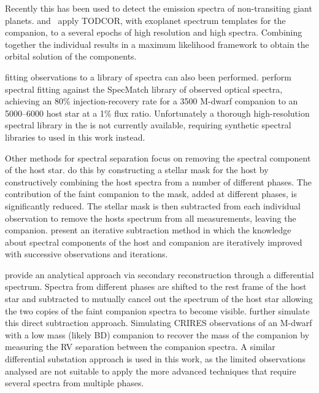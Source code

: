 Recently this has been used to detect the emission spectra of non-transiting giant planets. \citet{lockwood_nearir_2014} and~\citet{piskorz_evidence_2016} apply TODCOR, with exoplanet spectrum templates for the companion, to a several epochs of high resolution and high \snr{} \nir{} spectra. Combining together the individual results in a maximum likelihood framework to obtain the orbital solution of the components.

\textchisquared{} fitting observations to a library of spectra can also been performed.
\citet{kolbl_detection_2015} perform spectral fitting against the {SpecMatch} library of observed optical spectra, achieving an 80\% injection-recovery rate for a 3500\K{} {M-dwarf} companion to an 5000--6000\K{} host star at a 1\% flux ratio. Unfortunately a thorough high-resolution spectral library in the \nir{} is not currently available, requiring synthetic spectral libraries to used in this work instead.

Other methods for spectral separation focus on removing the spectral component of the host star.
\citet{rodler_weighing_2012} do this by constructing a stellar mask for the host by constructively combining the host spectra from a number of different phases.
The contribution of the faint companion to the mask, added at different phases, is significantly reduced.
The stellar mask is then subtracted from each individual observation to remove the hosts spectrum from all measurements, leaving the companion.
\citet{gonzalez_separation_2006} present an iterative subtraction method in which the knowledge about spectral components of the host and companion are iteratively improved with successive observations and iterations.

\citet{ferluga_separating_1997} provide an analytical approach via secondary reconstruction through a differential spectrum.
Spectra from different phases are shifted to the rest frame of the host star and subtracted to mutually cancel out the spectrum of the host star allowing the two copies of the faint companion spectra to become visible.
\citet{kostogryz_spectral_2013} further simulate this direct subtraction approach. Simulating CRIRES observations of an {M-dwarf} with a low mass (likely BD) companion to recover the mass of the companion by measuring the RV separation between the companion spectra.
A similar differential substation approach is used in this work, as the limited observations analysed are not suitable to apply the more advanced techniques that require several spectra from multiple phases.
